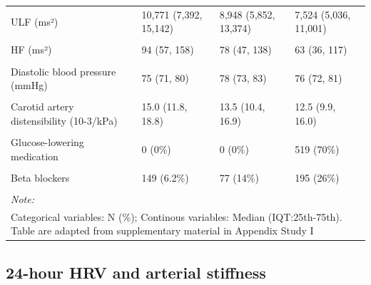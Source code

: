 \documentclass[
  a4paper,
  headsepline=true,
  open=left]{scrbook}
\begin{document}
\begin{landscape}
\begin{table}
{\begin{tabular}[t]{llll}
ULF (ms²) & 10,771 (7,392, 15,142) & 8,948 (5,852, 13,374) & 7,524 (5,036, 11,001)\\
\cellcolor{gray!6}{VLF (ms²)} & \cellcolor{gray!6}{1,198 (833, 1,692)} & \cellcolor{gray!6}{1,015 (685, 1,478)} & \cellcolor{gray!6}{816 (541, 1,267)}\\
\addlinespace
HF (ms²) & 94 (57, 158) & 78 (47, 138) & 63 (36, 117)\\
\cellcolor{gray!6}{Systolic blood pressure (mmHg)} & \cellcolor{gray!6}{123 (114, 133)} & \cellcolor{gray!6}{129 (122, 140)} & \cellcolor{gray!6}{130 (122, 139)}\\
Diastolic blood pressure (mmHg) & 75 (71, 80) & 78 (73, 83) & 76 (72, 81)\\
\cellcolor{gray!6}{Mean arterial pressure (mmHg)} & \cellcolor{gray!6}{95 (88, 102)} & \cellcolor{gray!6}{99 (93, 107)} & \cellcolor{gray!6}{98 (92, 105)}\\
Carotid artery distensibility (10-3/kPa) & 15.0 (11.8, 18.8) & 13.5 (10.4, 16.9) & 12.5 (9.9, 16.0)\\
\addlinespace
\cellcolor{gray!6}{Carotid-femoral pulse wave velocity (m/s)} & \cellcolor{gray!6}{8.08 (7.28, 9.16)} & \cellcolor{gray!6}{8.96 (7.84, 10.32)} & \cellcolor{gray!6}{9.36 (8.16, 10.80)}\\
Glucose-lowering medication & 0 (0\%) & 0 (0\%) & 519 (70\%)\\
\cellcolor{gray!6}{Antihypertensive medication} & \cellcolor{gray!6}{431 (18\%)} & \cellcolor{gray!6}{199 (37\%)} & \cellcolor{gray!6}{478 (64\%)}\\
Beta blockers & 149 (6.2\%) & 77 (14\%) & 195 (26\%)\\
\cellcolor{gray!6}{Lipid-lowering medication} & \cellcolor{gray!6}{280 (12\%)} & \cellcolor{gray!6}{141 (26\%)} & \cellcolor{gray!6}{484 (65\%)}\\
\bottomrule
\multicolumn{4}{l}{\rule{0pt}{1em}\textit{Note: }}\\
\multicolumn{4}{l}{\rule{0pt}{1em}Categorical variables: N (\%); Continous variables: Median (IQT:25th-75th). Table are adapted from supplementary material in Appendix Study I}\\
\end{tabular}}
\endgroup{}
\end{table}
\end{landscape}

\restoregeometry

\hypertarget{hour-hrv-and-arterial-stiffness}{%
\subsection{24-hour HRV and arterial
stiffness}\label{hour-hrv-and-arterial-stiffness}}
\end{document}
